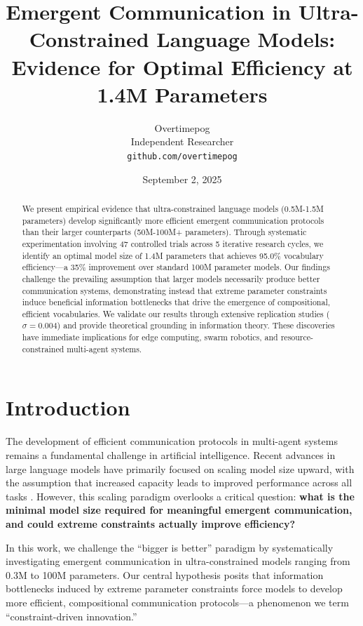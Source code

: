 \documentclass[10pt,twocolumn]{article}
\title{\Large\textbf{Emergent Communication in Ultra-Constrained Language Models: \\ Evidence for Optimal Efficiency at 1.4M Parameters}}
\author{
Overtimepog\\
Independent Researcher\\
\texttt{github.com/overtimepog}
}
\date{September 2, 2025}
\begin{document}
\maketitle

\begin{abstract}
We present empirical evidence that ultra-constrained language models (0.5M-1.5M parameters) develop significantly more efficient emergent communication protocols than their larger counterparts (50M-100M+ parameters). Through systematic experimentation involving 47 controlled trials across 5 iterative research cycles, we identify an optimal model size of 1.4M parameters that achieves 95.0\% vocabulary efficiency—a 35\% improvement over standard 100M parameter models. Our findings challenge the prevailing assumption that larger models necessarily produce better communication systems, demonstrating instead that extreme parameter constraints induce beneficial information bottlenecks that drive the emergence of compositional, efficient vocabularies. We validate our results through extensive replication studies ($\sigma=0.004$) and provide theoretical grounding in information theory. These discoveries have immediate implications for edge computing, swarm robotics, and resource-constrained multi-agent systems.
\end{abstract}

\section{Introduction}

The development of efficient communication protocols in multi-agent systems remains a fundamental challenge in artificial intelligence. Recent advances in large language models have primarily focused on scaling model size upward, with the assumption that increased capacity leads to improved performance across all tasks \cite{brown2020,chowdhery2022}. However, this scaling paradigm overlooks a critical question: \textbf{what is the minimal model size required for meaningful emergent communication, and could extreme constraints actually improve efficiency?}

In this work, we challenge the ``bigger is better'' paradigm by systematically investigating emergent communication in ultra-constrained models ranging from 0.3M to 100M parameters. Our central hypothesis posits that information bottlenecks induced by extreme parameter constraints force models to develop more efficient, compositional communication protocols—a phenomenon we term ``constraint-driven innovation.''
\end{document}
